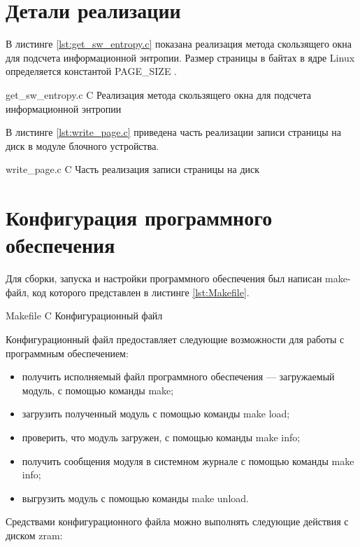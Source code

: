 \section{Детали реализации}

В листинге \ref{lst:get_sw_entropy.c} показана реализация метода скользящего окна для подсчета информационной энтропии. Размер страницы в байтах в ядре Linux определяется константой PAGE\_SIZE \cite{block-file}.

    {get_sw_entropy.c}
    {C}
    {Реализация метода скользящего окна для подсчета информационной энтропии}

В листинге \ref{lst:write_page.c} приведена часть реализации записи страницы на диск в модуле блочного устройства.

    {write_page.c}
    {C}
    {Часть реализация записи страницы на диск}

\section{Конфигурация программного обеспечения}

Для сборки, запуска и настройки программного обеспечения был написан make-файл, код которого представлен в листинге \ref{lst:Makefile}.

    {Makefile}
    {C}
    {Конфигурационный файл}

Конфигурационный файл предоставляет следующие возможности для работы с программным обеспечением:

\begin{itemize}
    \item получить исполняемый файл программного обеспечения --- загружаемый модуль, с помощью команды make;
    \item загрузить полученный модуль с помощью команды make load;
    \item проверить, что модуль загружен, с помощью команды make info;
    \item получить сообщения модуля в системном журнале с помощью команды make info;
    \item выгрузить модуль с помощью команды make unload.
\end{itemize}

Средствами конфигурационного файла можно выполнять следующие действия с диском zram:

